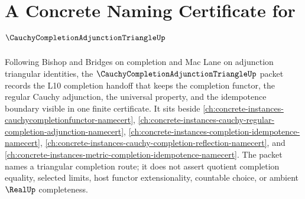 \chapter{A Concrete Naming Certificate for $\CauchyCompletionAdjunctionTriangleUp$}
\label{ch:concrete-instances-cauchy-completion-adjunction-triangle-namecert}

Following Bishop and Bridges on completion and Mac Lane on adjunction triangular identities, the $\CauchyCompletionAdjunctionTriangleUp$ packet records the L10 completion handoff that keeps the completion functor, the regular Cauchy adjunction, the universal property, and the idempotence boundary visible in one finite certificate. It sits beside \autoref{ch:concrete-instances-cauchycompletionfunctor-namecert}, \autoref{ch:concrete-instances-cauchy-regular-completion-adjunction-namecert}, \autoref{ch:concrete-instances-completion-idempotence-namecert}, \autoref{ch:concrete-instances-cauchy-completion-reflection-namecert}, and \autoref{ch:concrete-instances-metric-completion-idempotence-namecert}. The packet names a triangular completion route; it does not assert quotient completion equality, selected limits, host functor extensionality, countable choice, or ambient $\RealUp$ completeness.

